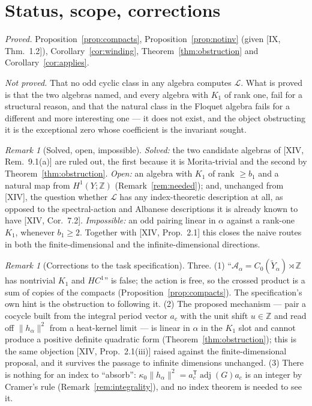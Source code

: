 \documentclass[11pt]{amsart}
\numberwithin{equation}{section}
\theoremstyle{definition}
\theoremstyle{remark}
\newtheorem{remark}[theorem]{Remark}
\newcommand{\Z}{\mathbb{Z}}
\newcommand{\cA}{\mathcal{A}}
\newcommand{\cL}{\mathcal{L}}
\newcommand{\Yt}{\widetilde Y_\alpha}
\begin{document}
\section{Status, scope, corrections}\label{sec:scope}

\emph{Proved.} Proposition~\ref{prop:compacts}, Proposition~\ref{prop:notinv} (given
[IX, Thm.~1.2]), Corollary~\ref{cor:winding}, Theorem~\ref{thm:obstruction} and
Corollary~\ref{cor:applies}.

\emph{Not proved.} That no odd cyclic class in any algebra computes $\cL$. What is proved
is that the two algebras named, and every algebra with $K_1$ of rank one, fail for a
structural reason, and that the natural class in the Floquet algebra fails for a different
and more interesting one --- it does not exist, and the object obstructing it is the
exceptional zero whose coefficient is the invariant sought.

\begin{remark}[Solved, open, impossible]\label{rem:soi}
\emph{Solved:} the two candidate algebras of [XIV, Rem.~9.1(a)] are ruled out, the first
because it is Morita-trivial and the second by Theorem~\ref{thm:obstruction}.
\emph{Open:} an algebra with $K_1$ of rank $\ge b_1$ and a natural map from $H^1(Y;\Z)$
(Remark~\ref{rem:needed}); and, unchanged from [XIV], the question whether $\cL$ has any
index-theoretic description at all, as opposed to the spectral-action and Albanese
descriptions it is already known to have [XIV, Cor.~7.2].
\emph{Impossible:} an odd pairing linear in $\alpha$ against a rank-one $K_1$, whenever
$b_1\ge2$. Together with [XIV, Prop.~2.1] this closes the naive routes in both the
finite-dimensional and the infinite-dimensional directions.
\end{remark}

\begin{remark}[Corrections to the task specification]\label{rem:corrections}
Three. (1) ``$\cA_\alpha=C_0(\Yt)\rtimes\Z$ has nontrivial $K_1$ and $HC^1$'' is false;
the action is free, so the crossed product is a sum of copies of the compacts
(Proposition~\ref{prop:compacts}). The specification's own hint is the obstruction to
following it. (2) The proposed mechanism --- pair a cocycle built from the integral period
vector $a_c$ with the unit shift $u\in\Z$ and read off $\|h_\alpha\|^2$ from a heat-kernel
limit --- is linear in $\alpha$ in the $K_1$ slot and cannot produce a positive definite
quadratic form (Theorem~\ref{thm:obstruction}); this is the same objection
[XIV, Prop.~2.1(iii)] raised against the finite-dimensional proposal, and it survives the
passage to infinite dimensions unchanged. (3) There is nothing for an index to
``absorb'': $\kappa_0\|h_\alpha\|^2=a_c^{\mathsf T}\operatorname{adj}(G)a_c$ is an integer
by Cramer's rule (Remark~\ref{rem:integrality}), and no index theorem is needed to see it.
\end{remark}
\end{document}
